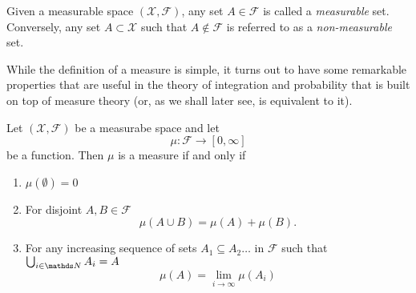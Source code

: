 \begin{defn}
\label{def:measurableSet}Given a measurable space $\left(\mathcal{X},\mathcal{F}\right)$,
any set $A\in\mathcal{F}$ is called a \emph{measurable }set. Conversely,
any set $A\subset\mathcal{X}$ such that $A\notin\mathcal{F}$ is
referred to as a \emph{non-measurable }set.
\end{defn}

While the definition of a measure is simple, it turns out to have
some remarkable properties that are useful in the theory of integration
and probability that is built on top of measure theory (or, as we
shall later see, is equivalent to it).
\begin{prop}
\label{prop:measureProperties}Let $\left(\mathcal{X},\mathcal{F}\right)$
be a measurabe space and let 
\[
\mu:\mathcal{F}\longrightarrow\left[0,\infty\right]
\]
be a function. Then $\mu$ is a measure if and only if

\begin{enumerate}[label=(\roman*),leftmargin=.1\linewidth,rightmargin=.4\linewidth]
	\item $\mu\left(\emptyset\right)= 0$
	\item For disjoint $A,B \in \mathcal{F}$ 
	\[
			\mu\left(A \cup B\right) = \mu\left(A\right) + \mu\left(B\right) .
	\]
	\item For any increasing sequence of sets $ A_1 \subseteq A_2 \ldots $ in $\mathcal{F}$ such that $\bigcup_{i\in\N} A_i = A $
	\[
			\mu\left(A\right) = \lim_{i \to \infty}\mu\left(A_i\right)
	\]
\end{enumerate}
\end{prop}

